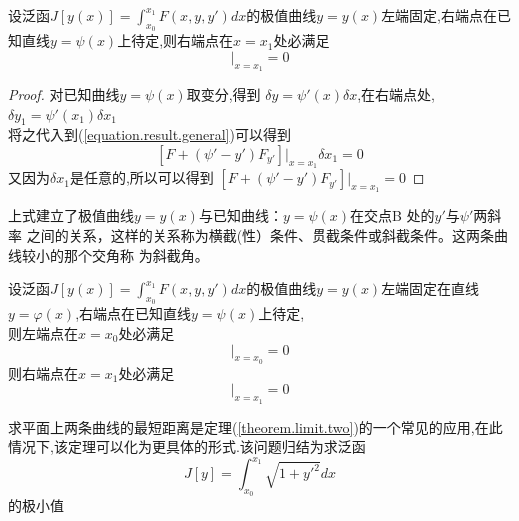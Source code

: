 \begin{theorem}
设泛函$J[y(x)]=\int_{x_0}^{x_1}F(x,y,y')dx$的极值曲线$y=y(x)$左端固定,右端点在已知直线$y=\psi(x)$上待定,则右端点在$x=x_1$处必满足
\begin{equation}
[F + (\psi' - y')F_{y'}]|_{x=x_1}=0
\end{equation}
\end{theorem}
\begin{proof}
 对已知曲线$y=\psi(x)$取变分,得到 $\delta y=\psi'(x)\delta x$,在右端点处,$\delta y_1=\psi'(x_1)\delta x_1$ \\
将之代入到(\ref{equation.result.general})可以得到
$$
[F + (\psi' - y')F_{y'}]|_{x=x_1}\delta x_1=0
$$
又因为$\delta x_1$是任意的,所以可以得到
$[F + (\psi' - y')F_{y'}]|_{x=x_1}=0$
\end{proof}
上式建立了极值曲线$y = y ( x )$与已知曲线：$y = \psi(x)$在交点B 处的$y'$与$\psi'$两斜率
之间的关系，这样的关系称为横截(性）条件、贯截条件或斜截条件。这两条曲线较小的那个交角称
为斜截角。

\begin{theorem}
\label{theorem.limit.two}
设泛函$J[y(x)]=\int_{x_0}^{x_1}F(x,y,y')dx$的极值曲线$y=y(x)$左端固定在直线$y=\varphi(x)$,右端点在已知直线$y=\psi(x)$上待定,\\
则左端点在$x=x_0$处必满足
\begin{equation}
[F + (\varphi' - y')F_{y'}]|_{x=x_0}=0
\end{equation}
则右端点在$x=x_1$处必满足
\begin{equation}
[F + (\psi' - y')F_{y'}]|_{x=x_1}=0
\end{equation}
\end{theorem}
求平面上两条曲线的最短距离是定理(\ref{theorem.limit.two})的一个常见的应用,在此情况下,该定理可以化为更具体的形式.该问题归结为求泛函
$$J[y]=\int_{x_0}^{x_1}\sqrt{1+y'^2}dx$$的极小值

